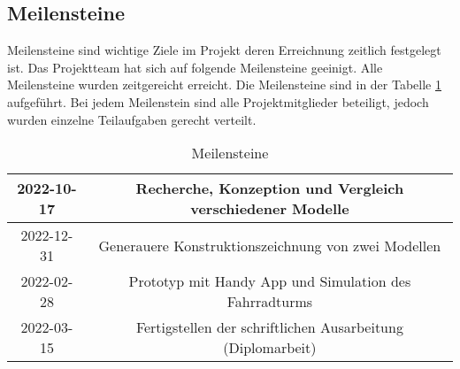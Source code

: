 \subsection{Meilensteine}

Meilensteine sind wichtige Ziele im Projekt deren Erreichnung zeitlich festgelegt ist. Das Projektteam hat sich auf folgende Meilensteine geeinigt. Alle Meilensteine wurden zeitgereicht erreicht. Die Meilensteine sind in der Tabelle \ref{tab:meilensteine} aufgeführt. Bei jedem Meilenstein sind alle Projektmitglieder beteiligt, jedoch wurden einzelne Teilaufgaben gerecht verteilt.

\begin{table}[ht]
  \begin{center}
    \begin{tabular} { |c|c| }
      \hline
      2022-10-17 & Recherche, Konzeption und Vergleich verschiedener Modelle   \\
      \hline
      2022-12-31 & Generauere Konstruktionszeichnung von zwei Modellen         \\
      \hline
      2022-02-28 & Prototyp mit Handy App und Simulation des Fahrradturms      \\
      \hline
      2022-03-15 & Fertigstellen der schriftlichen Ausarbeitung (Diplomarbeit) \\
      \hline
    \end{tabular}
    \caption{Meilensteine}
    \label{tab:meilensteine}
  \end{center}
\end{table}